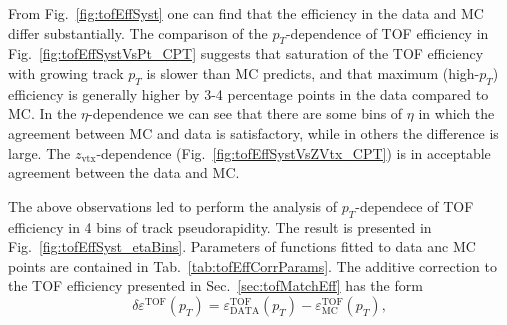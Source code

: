 From Fig.~\ref{fig:tofEffSyst} one can find that the efficiency in the data and MC differ substantially. The comparison of the $p_{T}$-dependence of TOF efficiency in Fig.~\ref{fig:tofEffSystVsPt_CPT} suggests that saturation of the TOF efficiency with growing track $p_{T}$ is slower than MC predicts, and that maximum (high-$p_{T}$) efficiency is generally higher by 3-4 percentage points in the data compared to MC. In the $\eta$-dependence we can see that there are some bins of $\eta$ in which the agreement between MC and data is satisfactory, while in others the difference is large. The $z_{\text{vtx}}$-dependence (Fig.~\ref{fig:tofEffSystVsZVtx_CPT}) is in acceptable agreement between the data and MC.

The above observations led to perform the analysis of $p_{T}$-dependece of TOF efficiency in 4 bins of track pseudorapidity. The result is presented in Fig.~\ref{fig:tofEffSyst_etaBins}. Parameters of functions fitted to data anc MC points are contained in Tab.~\ref{tab:tofEffCorrParams}. The additive correction to the TOF efficiency presented in Sec.~\ref{sec:tofMatchEff} has the form
\begin{equation}\label{eq:tofEffCorr}
 \delta\varepsilon^{\text{TOF}}(p_{T}) = \varepsilon^{\text{TOF}}_{\text{DATA}}(p_{T}) - \varepsilon^{\text{TOF}}_{\text{MC}}(p_{T}),
\end{equation}%
%
%

